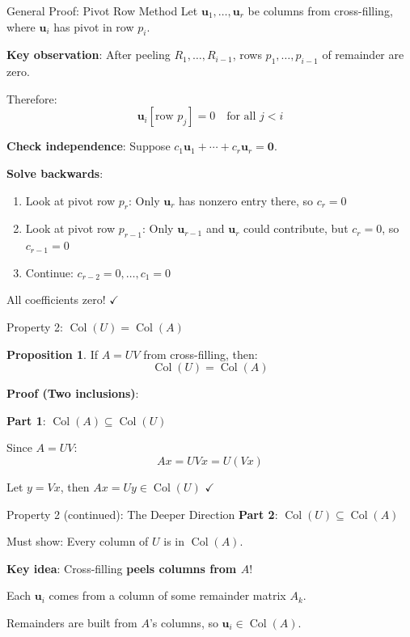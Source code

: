 \documentclass[10pt]{beamer}
\theoremstyle{definition}
\newtheorem{prop}{Proposition}[section]
\newcommand{\x}[1]{\alert{\textbf{#1}}}
\begin{document}
\begin{frame}{General Proof: Pivot Row Method}
Let $\mathbf{u}_1, \ldots, \mathbf{u}_r$ be columns from cross-filling, where $\mathbf{u}_i$ has pivot in row $p_i$.

\vfill
\x{Key observation}: After peeling $R_1, \ldots, R_{i-1}$, rows $p_1, \ldots, p_{i-1}$ of remainder are zero.

Therefore:
$$\mathbf{u}_i[\text{row } p_j] = 0 \quad \text{for all } j < i$$

\vfill
\textbf{Check independence}: Suppose $c_1\mathbf{u}_1 + \cdots + c_r\mathbf{u}_r = \mathbf{0}$.

\x{Solve backwards}:
\begin{enumerate}
\item Look at pivot row $p_r$: Only $\mathbf{u}_r$ has nonzero entry there, so $c_r = 0$
\item Look at pivot row $p_{r-1}$: Only $\mathbf{u}_{r-1}$ and $\mathbf{u}_r$ could contribute, but $c_r = 0$, so $c_{r-1} = 0$
\item Continue: $c_{r-2} = 0, \ldots, c_1 = 0$
\end{enumerate}

All coefficients zero! $\checkmark$
\end{frame}

\begin{frame}{Property 2: $\operatorname{Col}(U) = \operatorname{Col}(A)$}
\begin{prop}
If $A = UV$ from cross-filling, then:
$$\operatorname{Col}(U) = \operatorname{Col}(A)$$
\end{prop}

\vfill
\textbf{Proof (Two inclusions)}:

\x{Part 1}: $\operatorname{Col}(A) \subseteq \operatorname{Col}(U)$

Since $A = UV$:
$$Ax = UV x = U(Vx)$$

Let $y = Vx$, then $Ax = Uy \in \operatorname{Col}(U)$ $\checkmark$
\end{frame}

\begin{frame}{Property 2 (continued): The Deeper Direction}
\x{Part 2}: $\operatorname{Col}(U) \subseteq \operatorname{Col}(A)$

Must show: Every column of $U$ is in $\operatorname{Col}(A)$.

\vfill
\textbf{Key idea}: Cross-filling \x{peels columns from $A$}!

Each $\mathbf{u}_i$ comes from a column of some remainder matrix $A_k$.

Remainders are built from $A$'s columns, so $\mathbf{u}_i \in \operatorname{Col}(A)$.
\end{frame}
\end{document}
